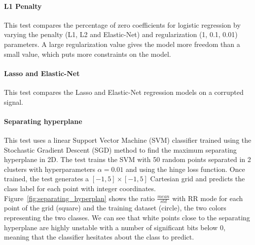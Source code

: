 \documentclass[11pt]{article}
\begin{document}
\paragraph{L1 Penalty}

This test compares the percentage of zero coefficients for logistic regression
by varying the penalty (L1, L2 and Elastic-Net) and regularization (1, 0.1, 0.01) parameters. 
A large regularization value gives the model more freedom than a small value, which puts more constraints on the model.






\paragraph{Lasso and Elastic-Net}


This test compares the Lasso and Elastic-Net regression models
on a corrupted signal.



\paragraph{Separating hyperplane}

This test uses a linear Support Vector Machine (SVM) classifier trained using the Stochastic Gradient Descent (SGD) method to find the maximum separating hyperplane in 2D.
The test trains the SVM with 50 random points separated in 2 clusters with hyperparameters $\alpha=0.01$ and using the hinge loss function. Once trained, the test generates a $[-1,5]\times[-1,5]$ Cartesian grid and predicts the class label for each point with integer coordinates. Figure~\ref{fig:separating_hyperplan} shows the ratio $\frac{mean}{std}$ with RR mode for each point of the grid (square) and the training dataset (circle), the two colors representing the two classes.
We can see that white points close to the separating hyperplane are highly unstable with a number of significant bits below 0, meaning that
the classifier hesitates about the class to predict.
\end{document}
